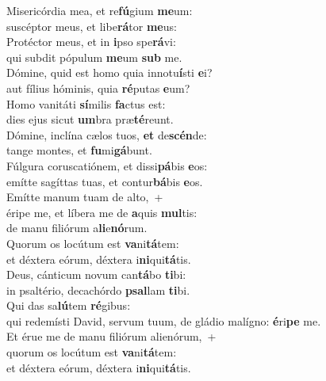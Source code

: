 \evenverse Misericórdia mea, et re\textbf{fú}gium \textbf{me}um:~\*\\
\evenverse suscéptor meus, et libe\textbf{rá}tor \textbf{me}us:\\
\oddverse Protéctor meus, et in \textbf{i}pso spe\textbf{rá}vi:~\*\\
\oddverse qui subdit pópulum \textbf{me}um \textbf{sub} me.\\
\evenverse Dómine, quid est homo quia innotu\textbf{í}sti \textbf{e}i?~\*\\
\evenverse aut fílius hóminis, quia \textbf{ré}putas \textbf{e}um?\\
\oddverse Homo vanitáti \textbf{sí}milis \textbf{fa}ctus est:~\*\\
\oddverse dies ejus sicut \textbf{um}bra præ\textbf{té}reunt.\\
\evenverse Dómine, inclína cælos tuos, \textbf{et} de\textbf{scén}de:~\*\\
\evenverse tange montes, et \textbf{fu}mi\textbf{gá}bunt.\\
\oddverse Fúlgura coruscatiónem, et dissi\textbf{pá}bis \textbf{e}os:~\*\\
\oddverse emítte sagíttas tuas, et contur\textbf{bá}bis \textbf{e}os.\\
\evenverse Emítte manum tuam de alto,~+\\
\evenverse  éripe me, et líbera me de \textbf{a}quis \textbf{mul}tis:~\*\\
\evenverse de manu filiórum a\textbf{li}e\textbf{nó}rum.\\
\oddverse Quorum os locútum est \textbf{va}ni\textbf{tá}tem:~\*\\
\oddverse et déxtera eórum, déxtera i\textbf{ni}qui\textbf{tá}tis.\\
\evenverse Deus, cánticum novum can\textbf{tá}bo \textbf{ti}bi:~\*\\
\evenverse in psaltério, decachórdo \textbf{psal}lam \textbf{ti}bi.\\
\oddverse Qui das sa\textbf{lú}tem \textbf{ré}gibus:~\*\\
\oddverse qui redemísti David, servum tuum, de gládio malígno: \textbf{é}ri\textbf{pe} me.\\
\evenverse Et érue me de manu filiórum alienórum,~+\\
\evenverse  quorum os locútum est \textbf{va}ni\textbf{tá}tem:~\*\\
\evenverse et déxtera eórum, déxtera i\textbf{ni}qui\textbf{tá}tis.\\
